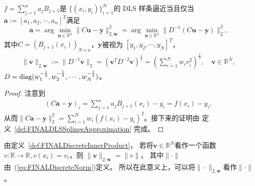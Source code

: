 \begin{thm}
  \label{thm:FINALDLSSplinesApproximationviaQRdecomp}
  $f=\sum_{j=1}^{n}a_{j}B_{j+1}$是
  $\{(x_{i},y_{i})\}_{i=1}^{N}$的 \textnormal{DLS} 样条逼近当且仅当
  $\mathbf{a}:=[a_{1},a_{2},\cdots,a_{n}]^{T}$满足
  \begin{equation}
    \label{eq:FINALDLSSplinesApproximationviaQRdecomp}
    \mathbf{a}=\arg\min_{\mathbf{u}\in \mathbb{R}^{n}}
    \|C\mathbf{u}-\mathbf{y}\|_{2,\mathbf{w}}^{2}
    =\arg\min_{\mathbf{u}\in \mathbb{R}^{n}}
    \|D^{-1}(C\mathbf{u}-\mathbf{y})\|_{2}^{2},
  \end{equation}
  其中$C=(B_{j+1}(x_{i}))_{N\times n}$，$\mathbf{y}$被视为
  $[y_{1},y_{2},\cdots,y_{N}]^{T}$，
  \begin{align*}
    \|\mathbf{v}\|_{2,\mathbf{w}}
    :=\|D^{-1}\mathbf{v}\|_{2}
    =\left(\mathbf{v}^{T}D^{-2}\mathbf{v}\right)^{\frac{1}{2}}=
    \left(\sum_{i=1}^{N}w_{i}v_{i}^{2}\right)^{\frac{1}{2}},\quad
    \mathbf{v}\in \mathbb{R}^{N},
  \end{align*}
  $D=\textnormal{diag}(w_{1}^{-\frac{1}{2}},w_{2}^{-\frac{1}{2}},\cdots,
  w_{N}^{-\frac{1}{2}})$。
\end{thm}
\begin{proof}
  注意到
  \begin{align*}
    (C\mathbf{a}-\mathbf{y})_{i}
    =\sum_{j=1}^{n}a_{j}B_{j+1}(x_{i})-y_{i}
    =f(x_{i})-y_{i},
  \end{align*}
  从而$\|C\mathbf{a}-\mathbf{y}\|_{2}^{2}
  =\sum_{i=1}^{N}w_{i}(f(x_{i})-y_{i})^{2}$。接下来的证明由
  定义~\ref{def:FINALDLSSplinesApproximation} 完成。
\end{proof}

  由定义~\ref{def:FINALDiscreteInnerProduct}，
  若将$\mathbf{v}\in \mathbb{R}^{N}$看作一个函数
  $v:\mathbb{R}\to \mathbb{R},v(x_{i})=v_{i}$，则
  $\|\mathbf{v}\|_{2,\mathbf{w}}=\|v\|$，
  其中$\|\cdot\|$由~(\ref{eq:FINALDiscreteNorm})定义。
  所以在此意义上，可以将$\|\cdot\|_{2,\mathbf{w}}$看作$\|\cdot\|$。

